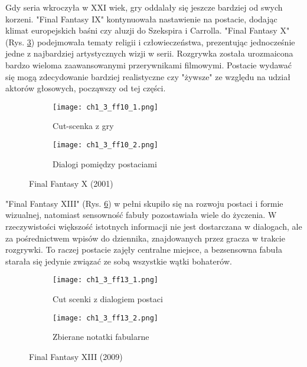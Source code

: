 \newpage

Gdy seria wkroczyła w XXI wiek, gry oddalały się jeszcze bardziej od swych korzeni. "Final Fantasy
IX" kontynuowała nastawienie na postacie, dodając klimat europejskich baśni czy aluzji do Szekspira i
Carrolla. "Final Fantasy X" (Rys. \ref{fig:ch1_3_ff10}) podejmowała tematy religii i człowieczeństwa,
prezentując jednocześnie jedne z najbardziej artystycznych wizji w serii\cite{the_evolution_of_final_fantasy}.
Rozgrywka została urozmaicona bardzo wieloma zaawansowanymi przerywnikami filmowymi. Postacie wydawać się
mogą zdecydowanie bardziej realistyczne czy "żywsze" ze względu na udział aktorów głosowych, począwszy
od tej części.

\begin{figure}[h]
    \begin{subfigure}{0.49\textwidth}
        \caption{Cut-scenka z gry}
        \texttt{[image: ch1\_3\_ff10\_1.png]}
        \label{subfig:ch_1_3_ff10_1}
    \end{subfigure}
    \begin{subfigure}{0.49\textwidth}
        \caption{Dialogi pomiędzy postaciami}
        \texttt{[image: ch1\_3\_ff10\_2.png]}
        \label{subfig:ch_1_3_ff10_2}
    \end{subfigure}
    \caption{Final Fantasy X (2001)}
    \label{fig:ch1_3_ff10}
\end{figure}

\newpage

"Final Fantasy XIII" (Rys. \ref{fig:ch1_3_ff13}) w pełni skupiło się na rozwoju postaci i
formie wizualnej, natomiast sensowność fabuły pozostawiała wiele do życzenia. W rzeczywistości większość
istotnych informacji nie jest dostarczana w dialogach, ale za pośrednictwem wpisów do dziennika,
znajdowanych przez gracza w trakcie rozgrywki. To raczej postacie zajęły centralne miejsce, a
bezsensowna fabuła starała się jedynie związać ze sobą wszystkie wątki
bohaterów\cite{the_evolution_of_final_fantasy}.

\begin{figure}[h]
    \begin{subfigure}{0.49\textwidth}
        \caption{Cut scenki z dialogiem postaci}
        \texttt{[image: ch1\_3\_ff13\_1.png]}
        \label{subfig:ch_1_3_ff13_1}
    \end{subfigure}
    \begin{subfigure}{0.49\textwidth}
        \caption{Zbierane notatki fabularne}
        \texttt{[image: ch1\_3\_ff13\_2.png]}
        \label{subfig:ch_1_3_ff13_2}
    \end{subfigure}
    \caption{Final Fantasy XIII (2009)}
    \label{fig:ch1_3_ff13}
\end{figure}

